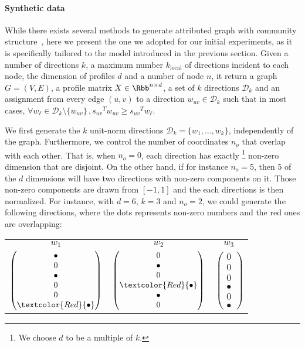 \paragraph{Synthetic data}
\label{par:synthetic_data}

While there exists several methods to generate attributed graph with community
structure~\autocites{Yang2013}{XuBayesian14}{Kataoka2016}, here we present the one we adopted for
our initial experiments, as it is specifically tailored to the model introduced in the previous
section. Given a number of directions $k$, a maximum number $k_\mathrm{local}$ of directions
incident to each node, the dimension of profiles $d$ and a number of node $n$, it return a graph
$G=(V,E)$, a profile matrix $X\in \Rbb^{n\times d}$, a set of $k$ directions $\mathcal{D}_k$ and an
assignment from every edge $(u,v)$ to a direction $w_{uv} \in \mathcal{D}_k$ such that in most
cases, $\forall w_\ell \in \mathcal{D}_k \setminus \{w_{uv}\}\,, {s_{uv}}^T w_{uv} \geq  {s_{uv}}^T
w_\ell$.

We first generate the $k$ unit-norm directions $\mathcal{D}_k=\{w_1, \ldots, w_k\}$, independently
of the graph. Furthermore, we control the number of coordinates $n_o$ that overlap with each other.
That is, when $n_o = 0$, each direction has exactly \footnote{We choose $d$ to be a
multiple of $k$.} non-zero dimension that are disjoint. On the other hand, if for instance $n_o=5$,
then $5$ of the $d$ dimensions will have two directions with non-zero components on it. Those
non-zero components are drawn \uar{} from $[-1, 1]$ and the each directions is then normalized. For
instance, with $d=6$, $k=3$ and $n_o=2$, we could generate the following directions, where the dots
represents non-zero numbers and the red ones are overlapping:
\vspace{-.5\baselineskip}
\begin{center}
	\begin{tabular}{ccc}
		$w_1$ & $w_2$ & $w_3$ \\
		$\begin{pmatrix}
			\bullet \\
			0 \\
			\bullet \\
			0 \\
			0 \\
			\textcolor{Red}{\bullet}
		\end{pmatrix}$ & 
		$\begin{pmatrix}
			0 \\
			\bullet \\
			0 \\
			\textcolor{Red}{\bullet} \\
			\bullet \\
			0
		\end{pmatrix}$ &
		$\begin{pmatrix}
			0 \\
			0 \\
			0 \\
			\bullet \\
			0 \\
			\bullet
		\end{pmatrix}$
	\end{tabular}
\end{center}

